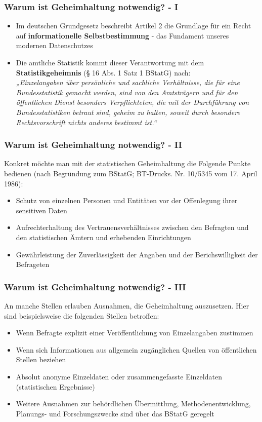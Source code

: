 \documentclass[aspectratio=169]{beamer}
\begin{document}
\begin{frame}{}
    \frametitle{Warum ist Geheimhaltung notwendig? - I}
    \begin{itemize}
        \item Im deutschen Grundgesetz beschreibt Artikel 2 die Grundlage für ein Recht auf \textbf{informationelle Selbstbestimmung} - das Fundament unseres modernen Datenschutzes
        \item Die amtliche Statistik kommt dieser Verantwortung mit dem \textbf{Statistikgeheimnis} (§ 16 Abs. 1 Satz 1 BStatG) nach: \\
        \textit{„Einzelangaben über persönliche und sachliche Verhältnisse, die für eine Bundesstatistik
        gemacht werden, sind von den Amtsträgern und für den öffentlichen Dienst besonders
        Verpflichteten, die mit der Durchführung von Bundesstatistiken betraut sind, geheim zu halten,
        soweit durch besondere Rechtsvorschrift nichts anderes bestimmt ist.“}
    \end{itemize}
\end{frame}


\begin{frame}{}
    \frametitle{Warum ist Geheimhaltung notwendig? - II}
    Konkret möchte man mit der statistischen Geheimhaltung die Folgende Punkte bedienen (nach Begründung zum BStatG; BT-Drucks. Nr. 10/5345 vom 17. April 1986):
    \begin{itemize}
        \item Schutz von einzelnen Personen und Entitäten vor der Offenlegung ihrer sensitiven Daten
        \item Aufrechterhaltung des Vertrauensverhältnisses zwischen den Befragten und den statistischen Ämtern und erhebenden Einrichtungen
        \item Gewährleistung der Zuverlässigkeit der Angaben und der Berichswilligkeit der Befrageten
    \end{itemize}
\end{frame}


\begin{frame}{}
    \frametitle{Warum ist Geheimhaltung notwendig? - III}
    An manche Stellen erlauben Ausnahmen, die Geheimhaltung auszusetzen. Hier sind beispielsweise die folgenden Stellen betroffen:
    \begin{itemize}
        \item Wenn Befragte explizit einer Veröffentlichung von Einzelangaben zustimmen
        \item Wenn sich Informationen aus allgemein zugänglichen Quellen von öffentlichen Stellen beziehen
        \item Absolut anonyme Einzeldaten oder zusammengefasste Einzeldaten (statistischen Ergebnisse)
        \item Weitere Ausnahmen zur behördlichen Übermittlung, Methodenentwicklung, Planungs- und Forschungszwecke sind über das BStatG geregelt
    \end{itemize}
\end{frame}
\end{document}
